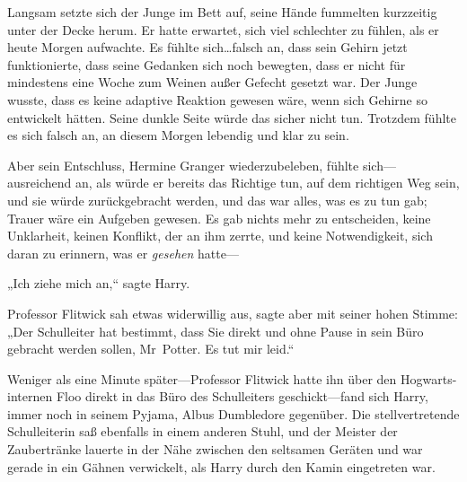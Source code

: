 Langsam setzte sich der Junge im Bett auf, seine Hände fummelten kurzzeitig unter der Decke herum. Er hatte erwartet, sich viel schlechter zu fühlen, als er heute Morgen aufwachte. Es fühlte sich…falsch an, dass sein Gehirn jetzt funktionierte, dass seine Gedanken sich noch bewegten, dass er nicht für mindestens eine Woche zum Weinen außer Gefecht gesetzt war. Der Junge wusste, dass es keine adaptive Reaktion gewesen wäre, wenn sich Gehirne so entwickelt hätten. Seine dunkle Seite würde das sicher nicht tun. Trotzdem fühlte es sich falsch an, an diesem Morgen lebendig und klar zu sein.

Aber sein Entschluss, Hermine Granger wiederzubeleben, fühlte sich—ausreichend an, als würde er bereits das Richtige tun, auf dem richtigen Weg sein, und sie würde zurückgebracht werden, und das war alles, was es zu tun gab; Trauer wäre ein Aufgeben gewesen. Es gab nichts mehr zu entscheiden, keine Unklarheit, keinen Konflikt, der an ihm zerrte, und keine Notwendigkeit, sich daran zu erinnern, was er \emph{gesehen} hatte—

„Ich ziehe mich an,“ sagte Harry.

Professor Flitwick sah etwas widerwillig aus, sagte aber mit seiner hohen Stimme: „Der Schulleiter hat bestimmt, dass Sie direkt und ohne Pause in sein Büro gebracht werden sollen, Mr~Potter. Es tut mir leid.“

Weniger als eine Minute später—Professor Flitwick hatte ihn über den Hogwarts-internen Floo direkt in das Büro des Schulleiters geschickt—fand sich Harry, immer noch in seinem Pyjama, Albus Dumbledore gegenüber. Die stellvertretende Schulleiterin saß ebenfalls in einem anderen Stuhl, und der Meister der Zaubertränke lauerte in der Nähe zwischen den seltsamen Geräten und war gerade in ein Gähnen verwickelt, als Harry durch den Kamin eingetreten war.

